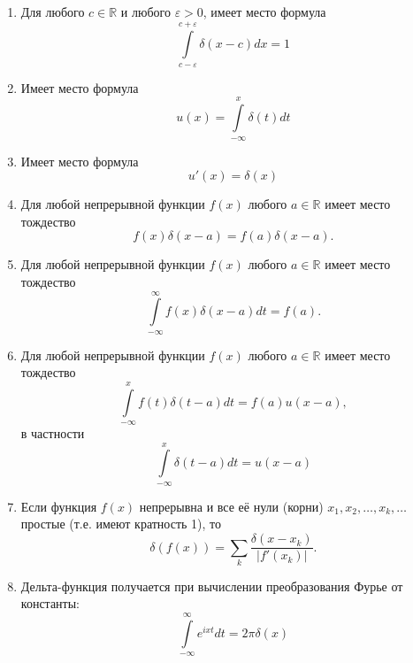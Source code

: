\begin{prop}
\label{prop:13.5}
\begin{enumerate}
	\item  Для любого $c \in \mathbb{R}$ и любого $\varepsilon > 0$, имеет место формула
\begin{equation*}
	\int\limits_{c-\varepsilon}^{c+\varepsilon}\delta(x-c)dx=1
\end{equation*}
	\item Имеет место формула \begin{equation*}
		u(x)=\int\limits_{-\infty}^x\delta(t)dt
	\end{equation*}
	\item Имеет место формула \begin{equation*}
		u'(x)=\delta(x)
	\end{equation*}
	\item Для любой непрерывной функции $f(x)$ любого $a \in \mathbb{R}$ имеет место тождество
	\begin{equation*}
		f(x)\delta(x-a)=f(a)\delta(x-a).
	\end{equation*}
	\item Для любой непрерывной функции $f(x)$ любого $a \in \mathbb{R}$ имеет место тождество
	\begin{equation*}
		\int\limits_{-\infty}^{\infty}f(x)\delta(x-a)dt=f(a).
	\end{equation*}
	\item Для любой непрерывной функции $f(x)$ любого $a \in \mathbb{R}$ имеет место тождество
	\begin{equation*}
		\int\limits_{-\infty}^xf(t)\delta(t-a)dt=f(a)u(x-a),
	\end{equation*}
	в частности
	\begin{equation*}
		\int\limits_{-\infty}^x\delta(t-a)dt=u(x-a)
	\end{equation*}
	\item Если функция $f(x)$ непрерывна и все её нули (корни) $x_1, x_2,\dots , x_k, \dots$ простые (т.е. имеют кратность 1), то
	\begin{equation*}
		\delta(f(x))=\sum\limits_k\frac{\delta(x-x_k)}{|f'(x_k)|}.
	\end{equation*}
	\item Дельта-функция получается при вычислении преобразования Фурье
	от константы:
	\begin{equation*}
		\int\limits_{-\infty}^{\infty}e^{ixt}dt=2\pi \delta(x)
	\end{equation*}
\end{enumerate}
\end{prop}

